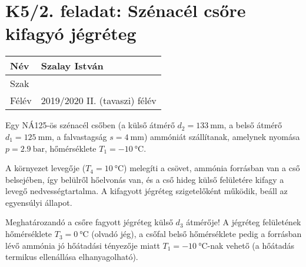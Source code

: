 

\section*{K5/2. feladat: Szénacél csőre kifagyó jégréteg}

\begin{tabular}{ | p{2cm} | p{14cm} | } 
	\hline
	Név & Szalay István \\ 
	\hline
	Szak & \\ 
	\hline
	Félév & 2019/2020 II. (tavaszi) félév \\ 
	\hline
\end{tabular}
\vspace{0.5cm}

\noindent Egy NÁ125-ös szénacél csőben (a külső átmérő $d_2 = \SI{133}{\milli\meter}$, a belső átmérő $d_1 = \SI{125}{\milli\meter}$, a falvastagság $s = \SI{4}{\milli\meter}$) ammóniát szállítanak, amelynek nyomása $p = \SI{2.9}{\bar}$, hőmérséklete $T_1 = \SI{-10}{\celsius}$.

A környezet levegője ($T_4 = \SI{+10}{\celsius}$) melegíti a csövet, ammónia forrásban van a cső belsejében, így belülről hőelvonás van, és a cső hideg külső felületére kifagy a levegő nedvességtartalma. A kifagyott jégréteg szigetelőként működik, beáll az egyensúlyi állapot.

Meghatározandó a csőre fagyott jégréteg külső $d_3$ átmérője! A jégréteg felületének hőmérséklete $T_3 = \SI{0}{\celsius}$ (olvadó jég), a csőfal belső hőmérséklete pedig a forrásban lévő ammónia jó hőátadási tényezője miatt $T_1 = \SI{-10}{\celsius}$-nak vehető (a hőátadás termikus ellenállása elhanyagolható).


